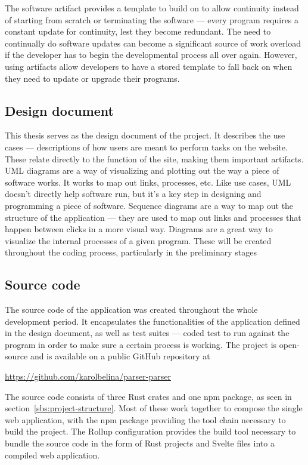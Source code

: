 \documentclass[english,engineering]{wizthesis}
\begin{document}
The software artifact provides a template to build on to allow continuity
instead of starting from scratch or terminating the software --- every program
requires a constant update for continuity, lest they become redundant. The need
to continually do software updates can become a significant source of work
overload if the developer has to begin the developmental process all over again.
However, using artifacts allow developers to have a stored template to fall back
on when they need to update or upgrade their programs.

\subsection*{Design document}

This thesis serves as the design document of the project. It describes the use
cases --- descriptions of how users are meant to perform tasks on the website.
These relate directly to the function of the site, making them important
artifacts. UML diagrams are a way of visualizing and plotting out the way a
piece of software works. It works to map out links, processes, etc. Like use
cases, UML doesn't directly help software run, but it's a key step in designing
and programming a piece of software. Sequence diagrams are a way to map out the
structure of the application --- they are used to map out links and processes
that happen between clicks in a more visual way. Diagrams are a great way to
visualize the internal processes of a given program. These will be created
throughout the coding process, particularly in the preliminary stages

\subsection*{Source code}

The source code of the application was created throughout the whole development
period. It encapsulates the functionalities of the application defined in the
design document, as well as test suites --- coded test to run against the
program in order to make sure a certain process is working. The project is
open-source and is available on a public GitHub repository at
\begin{center}
  \url{https://github.com/karolbelina/parser-parser}
\end{center}

The source code consists of three Rust crates and one npm package, as seen in
section~\ref{sbs:project-structure}. Most of these work together to compose the
single web application, with the npm package providing the tool chain necessary
to build the project. The Rollup configuration provides the build tool necessary
to bundle the source code in the form of Rust projects and Svelte files into a
compiled web application.
\end{document}
